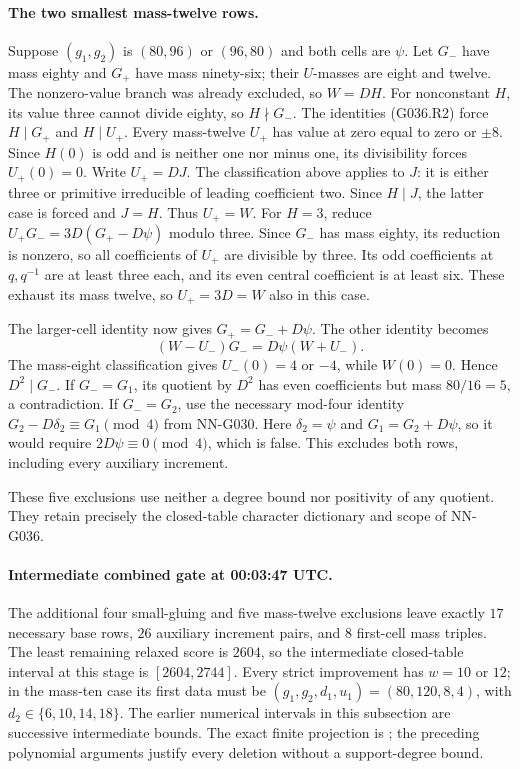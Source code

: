 \paragraph{The two smallest mass-twelve rows.}
Suppose $(g_1,g_2)$ is $(80,96)$ or $(96,80)$ and both
cells are $\psi$. Let $G_-$ have mass eighty and $G_+$
have mass ninety-six; their $U$-masses are eight and twelve.
The nonzero-value branch was already excluded, so $W=DH$.
For nonconstant $H$, its value three cannot divide eighty,
so $H\nmid G_-$. The identities (G036.R2) force
$H\mid G_+$ and $H\mid U_+$. Every mass-twelve $U_+$
has value at zero equal to zero or $\pm8$. Since $H(0)$ is
odd and is neither one nor minus one, its divisibility
forces $U_+(0)=0$. Write $U_+=DJ$. The classification above
applies to $J$: it is either three or primitive irreducible
of leading coefficient two. Since $H\mid J$, the latter
case is forced and $J=H$. Thus $U_+=W$.
For $H=3$, reduce $U_+G_-=3D(G_+-D\psi)$ modulo three.
Since $G_-$ has mass eighty, its reduction is nonzero, so
all coefficients of $U_+$ are divisible by three. Its odd
coefficients at $q,q^{-1}$ are at least three each, and its
even central coefficient is at least six. These exhaust its
mass twelve, so $U_+=3D=W$ also in this case.

The larger-cell identity now gives $G_+=G_-+D\psi$.
The other identity becomes
\[
             (W-U_-)G_-=D\psi(W+U_-).
\]
The mass-eight classification gives $U_-(0)=4$ or $-4$,
while $W(0)=0$. Hence $D^2\mid G_-$.
If $G_-=G_1$, its quotient by $D^2$ has even coefficients
but mass $80/16=5$, a contradiction.
If $G_-=G_2$, use the necessary mod-four identity
$G_2-D\delta_2\equiv G_1\pmod4$ from NN-G030.
Here $\delta_2=\psi$ and $G_1=G_2+D\psi$, so it would
require $2D\psi\equiv0\pmod4$, which is false.
This excludes both rows, including every auxiliary increment.

These five exclusions use neither a degree bound nor
positivity of any quotient. They retain precisely the
closed-table character dictionary and scope of NN-G036.

\paragraph{Intermediate combined gate at 00:03:47 UTC.}
The additional four small-gluing and five mass-twelve exclusions
leave exactly $17$ necessary base rows, $26$ auxiliary increment
pairs, and $8$ first-cell mass triples. The least remaining
relaxed score is $2604$, so the intermediate closed-table
interval at this stage is $[2604,2744]$. Every strict improvement has $w=10$
or $12$; in the mass-ten case its first data must be
$(g_1,g_2,d_1,u_1)=(80,120,8,4)$, with
$d_2\in\{6,10,14,18\}$. The earlier numerical intervals in
this subsection are successive intermediate bounds.
The exact finite projection is
;
the preceding polynomial arguments justify every deletion
without a support-degree bound.

